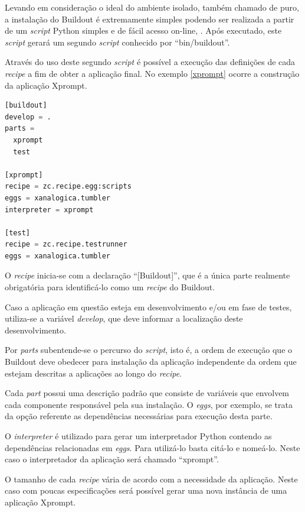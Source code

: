 Levando em consideração o ideal do ambiente isolado, também chamado de puro, a instalação do Buildout é extremamente simples podendo ser realizada a partir de um \textit{script} Python simples e de fácil acesso on-line, \cite{BOOTSTRAP}. Após executado, este \textit{script} gerará um segundo \textit{script} conhecido por ``bin/buildout''. 

Através do uso deste segundo \textit{script} é possível a execução das definições de cada \textit{recipe} a fim de obter a aplicação final. No exemplo \ref{xprompt} ocorre a construção da aplicação Xprompt.

{\singlespace
\begin{lstlisting}[caption=Exemplo de um \textit{script} Buildout,language=python,label={xprompt}]
[buildout]
develop = .
parts = 
  xprompt
  test

[xprompt]
recipe = zc.recipe.egg:scripts
eggs = xanalogica.tumbler
interpreter = xprompt

[test]
recipe = zc.recipe.testrunner
eggs = xanalogica.tumbler

\end{lstlisting}
}

O \textit{recipe} inicia-se com a declaração ``[Buildout]'', que é a única parte realmente obrigatória para identificá-lo como um \textit{recipe} do Buildout.

Caso a aplicação em questão esteja em desenvolvimento e/ou em fase de testes, utiliza-se a variável \textit{develop}, que deve informar a localização deste desenvolvimento.

Por \textit{parts} subentende-se o percurso do \textit{script}, isto é, a ordem de execução que o Buildout deve obedecer para instalação da aplicação independente da ordem que estejam descritas a aplicações ao longo do \textit{recipe}.

Cada \textit{part} possui uma descrição padrão que consiste de variáveis que envolvem cada componente responsável pela sua instalação. O \textit{eggs}, por exemplo, se trata da opção referente as dependências necessárias para execução desta parte.

O \textit{interpreter} é utilizado para gerar um interpretador Python contendo as dependências relacionadas em \textit{eggs}. Para utilizá-lo basta citá-lo e nomeá-lo. Neste caso o interpretador da aplicação será chamado ``xprompt''.

O tamanho de cada \textit{recipe} vária de acordo com a necessidade da aplicação. Neste caso com poucas especificações será possível gerar uma nova instância de uma aplicação Xprompt.

